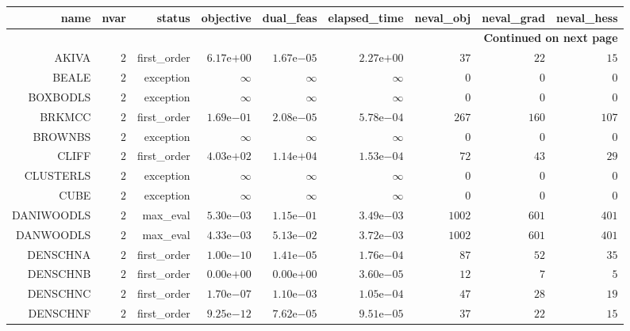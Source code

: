 \begin{longtable}{rrrrrrrrr}
\hline
name & nvar & status & objective & dual\_feas & elapsed\_time & neval\_obj & neval\_grad & neval\_hess \\\hline
\endhead
\hline
\multicolumn{9}{r}{{\bfseries Continued on next page}}\\
\hline
\endfoot
\endlastfoot
AKIVA & \(     2\) & first\_order & \( 6.17\)e\(+00\) & \( 1.67\)e\(-05\) & \( 2.27\)e\(+00\) & \(    37\) & \(    22\) & \(    15\) \\
BEALE & \(     2\) & exception & \(\infty\) & \(\infty\) & \(\infty\) & \(     0\) & \(     0\) & \(     0\) \\
BOXBODLS & \(     2\) & exception & \(\infty\) & \(\infty\) & \(\infty\) & \(     0\) & \(     0\) & \(     0\) \\
BRKMCC & \(     2\) & first\_order & \( 1.69\)e\(-01\) & \( 2.08\)e\(-05\) & \( 5.78\)e\(-04\) & \(   267\) & \(   160\) & \(   107\) \\
BROWNBS & \(     2\) & exception & \(\infty\) & \(\infty\) & \(\infty\) & \(     0\) & \(     0\) & \(     0\) \\
CLIFF & \(     2\) & first\_order & \( 4.03\)e\(+02\) & \( 1.14\)e\(+04\) & \( 1.53\)e\(-04\) & \(    72\) & \(    43\) & \(    29\) \\
CLUSTERLS & \(     2\) & exception & \(\infty\) & \(\infty\) & \(\infty\) & \(     0\) & \(     0\) & \(     0\) \\
CUBE & \(     2\) & exception & \(\infty\) & \(\infty\) & \(\infty\) & \(     0\) & \(     0\) & \(     0\) \\
DANIWOODLS & \(     2\) & max\_eval & \( 5.30\)e\(-03\) & \( 1.15\)e\(-01\) & \( 3.49\)e\(-03\) & \(  1002\) & \(   601\) & \(   401\) \\
DANWOODLS & \(     2\) & max\_eval & \( 4.33\)e\(-03\) & \( 5.13\)e\(-02\) & \( 3.72\)e\(-03\) & \(  1002\) & \(   601\) & \(   401\) \\
DENSCHNA & \(     2\) & first\_order & \( 1.00\)e\(-10\) & \( 1.41\)e\(-05\) & \( 1.76\)e\(-04\) & \(    87\) & \(    52\) & \(    35\) \\
DENSCHNB & \(     2\) & first\_order & \( 0.00\)e\(+00\) & \( 0.00\)e\(+00\) & \( 3.60\)e\(-05\) & \(    12\) & \(     7\) & \(     5\) \\
DENSCHNC & \(     2\) & first\_order & \( 1.70\)e\(-07\) & \( 1.10\)e\(-03\) & \( 1.05\)e\(-04\) & \(    47\) & \(    28\) & \(    19\) \\
DENSCHNF & \(     2\) & first\_order & \( 9.25\)e\(-12\) & \( 7.62\)e\(-05\) & \( 9.51\)e\(-05\) & \(    37\) & \(    22\) & \(    15\) \\

\end{longtable}
